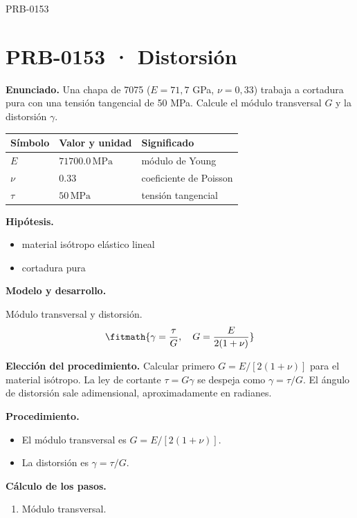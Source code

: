 \begin{studiumworked}{PRB-0153}

\section{PRB-0153 · Distorsión}

\textbf{Enunciado.} Una chapa de 7075 ($E = 71{,}7$ GPa, $\nu = 0{,}33$) trabaja a cortadura pura con una tensión tangencial de 50 MPa. Calcule el módulo transversal $G$ y la distorsión $\gamma$.

\par\medskip\noindent\begin{tabular}{@{}p{.18\linewidth}p{.26\linewidth}p{.48\linewidth}@{}}
\toprule Símbolo & Valor y unidad & Significado\\\midrule
$E$ & $71700.0\,\mathrm{MPa}$ & módulo de Young\\
$\nu$ & $0.33$ & coeficiente de Poisson\\
$\tau$ & $50\,\mathrm{MPa}$ & tensión tangencial\\
\bottomrule\end{tabular}\par\medskip

\textbf{Hipótesis.}\begin{itemize}\item material isótropo elástico lineal
\item cortadura pura\end{itemize}

\textbf{Modelo y desarrollo.}

Módulo transversal y distorsión.\[\fitmath{\gamma = \frac{\tau}{G},\quad G = \frac{E}{2(1+\nu)}}\]

\textbf{Elección del procedimiento.} Calcular primero $G=E/[2(1+\nu)]$ para el material isótropo. La ley de cortante $\tau=G\gamma$ se despeja como $\gamma=\tau/G$. El ángulo de distorsión sale adimensional, aproximadamente en radianes.

\textbf{Procedimiento.}\begin{itemize}\item El módulo transversal es $G = E/[2(1+\nu)]$.
\item La distorsión es $\gamma = \tau/G$.\end{itemize}

\textbf{Cálculo de los pasos.}

\begin{enumerate}

\item Módulo transversal.


\end{enumerate}
\end{studiumworked}
